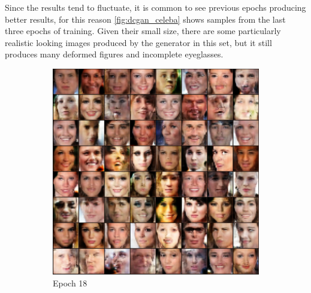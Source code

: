 Since the results tend to fluctuate, it is common to see previous epochs producing better results, for this reason \autoref{fig:dcgan_celeba} shows samples from the last three epochs of training. Given their small size, there are some particularly realistic looking images produced by the generator in this set, but it still produces many deformed figures and incomplete eyeglasses. 
\begin{figure}[hbt]
    \caption{DCGAN trained on CelebA}
    \centering
        \begin{subfigure}[b]{0.3\textwidth}
        \centering
        \includegraphics[width=\textwidth]{chapters/Experiments/Other/dcgan_celeba18.png}
        \caption{Epoch 18}
        \end{subfigure}
    \hfill
        \begin{subfigure}[b]{0.3\textwidth}
        \centering

\end{subfigure}
\end{figure}
